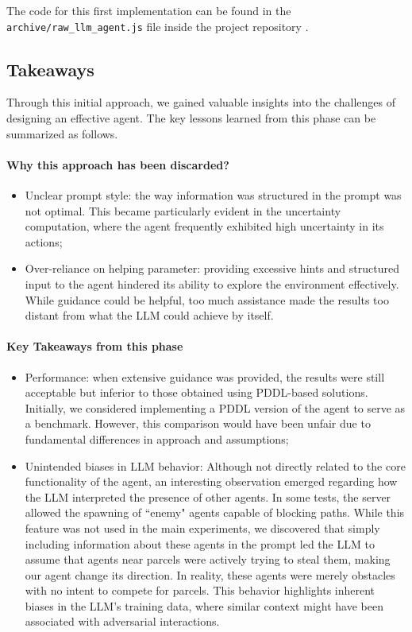 The code for this first implementation can be found in the \texttt{archive/raw\_llm\_agent.js}
file inside the project repository \cite{projectrepo}.

\subsection{Takeaways}
Through this initial approach, we gained valuable insights into the challenges
of designing an effective agent. The key lessons learned from this phase can be summarized
as follows.

\paragraph{Why this approach has been discarded?}

\begin{itemize}
  \item Unclear prompt style: the way information was structured in the prompt
    was not optimal. This became particularly evident in the uncertainty computation,
    where the agent frequently exhibited high uncertainty in its actions;

  \item Over-reliance on helping parameter: providing excessive hints and
    structured input to the agent hindered its ability to explore the
    environment effectively. While guidance could be helpful, too much
    assistance made the results too distant from what the LLM could achieve by
    itself.
\end{itemize}

\paragraph{Key Takeaways from this phase}
\begin{itemize}
  \item Performance: when extensive guidance was provided, the results were still
    acceptable but inferior to those obtained using PDDL-based solutions.
    Initially, we considered implementing a PDDL version of the agent to serve as
    a benchmark. However, this comparison would have been unfair due to fundamental
    differences in approach and assumptions;

  \item Unintended biases in LLM behavior: Although not directly related to the
    core functionality of the agent, an interesting observation emerged regarding
    how the LLM interpreted the presence of other agents. In some tests, the server
    allowed the spawning of ``enemy" agents capable of blocking paths. While this
    feature was not used in the main experiments, we discovered that simply
    including information about these agents in the prompt led the LLM to assume
    that agents near parcels were actively trying to steal them, making our agent
    change its direction. In reality, these agents were merely obstacles with no
    intent to compete for parcels. This behavior highlights inherent biases in
    the LLM's training data, where similar context might have been associated with
    adversarial interactions.
\end{itemize}

